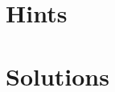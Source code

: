 \documentclass[oneside]{book}
\numberwithin{equation}{section}
\begin{document}
\section{Hints}

\section{Solutions}




\printbibliography[heading=bibintoc]
	
\end{document}
